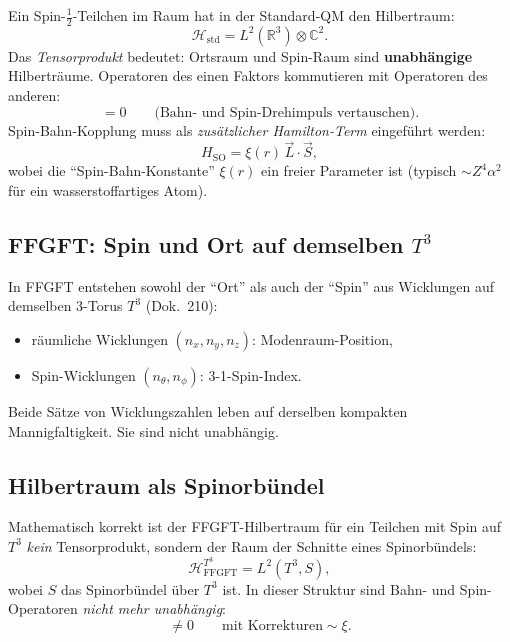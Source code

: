 Ein Spin-$\tfrac{1}{2}$-Teilchen im Raum hat in der Standard-QM den
Hilbertraum:
\begin{equation}
  \mathcal{H}_{\text{std}} = L^2(\mathbb{R}^3) \otimes \mathbb{C}^2.
\end{equation}
Das \emph{Tensorprodukt} bedeutet: Ortsraum und Spin-Raum sind
\textbf{unabhängige} Hilberträume. Operatoren des einen Faktors
kommutieren mit Operatoren des anderen:
\begin{equation}
  [L_i, S_j] = 0
  \qquad \text{(Bahn- und Spin-Drehimpuls vertauschen)}.
\end{equation}
Spin-Bahn-Kopplung muss als \emph{zusätzlicher Hamilton-Term}
eingeführt werden:
\begin{equation}
  H_{\text{SO}} = \xi(r)\, \vec L \cdot \vec S,
\end{equation}
wobei die \enquote{Spin-Bahn-Konstante} $\xi(r)$ ein freier
Parameter ist (typisch $\sim Z^4 \alpha^2$ für ein
wasserstoffartiges Atom).

\subsection{FFGFT: Spin und Ort auf demselben $T^3$}

In FFGFT entstehen sowohl der \enquote{Ort} als auch der
\enquote{Spin} aus Wicklungen auf demselben 3-Torus $T^3$ (Dok.~210):
\begin{itemize}[leftmargin=2em,itemsep=2pt,topsep=2pt]
  \item räumliche Wicklungen $(n_x, n_y, n_z)$: Modenraum-Position,
  \item Spin-Wicklungen $(n_\theta, n_\phi)$: 3-1-Spin-Index.
\end{itemize}
Beide Sätze von Wicklungszahlen leben auf derselben kompakten
Mannigfaltigkeit. Sie sind nicht unabhängig.

\subsection{Hilbertraum als Spinorbündel}

Mathematisch korrekt ist der FFGFT-Hilbertraum für ein Teilchen
mit Spin auf $T^3$ \emph{kein} Tensorprodukt, sondern der Raum der
Schnitte eines Spinorbündels:
\begin{equation}
  \boxed{
    \mathcal{H}^{T^3}_{\text{FFGFT}}
    = L^2(T^3, S),
  }
\end{equation}
wobei $S$ das Spinorbündel über $T^3$ ist. In dieser Struktur sind
Bahn- und Spin-Operatoren \emph{nicht mehr unabhängig}:
\begin{equation}
  [L_i, S_j] \neq 0
  \qquad \text{mit Korrekturen} \sim \xi.
\end{equation}


